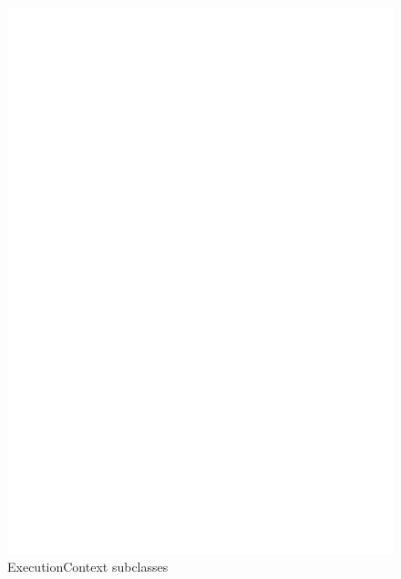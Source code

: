 \begin{figure}[tp]
\begin{center}
\includegraphics[scale=0.85]
{architettura_interna/dia/cntxclass}
\caption[ExecutionContext Class Diagram]{
   	\textsf{{\small ExecutionContext subclasses}} }
  \label{fig:cntxclass}
\end{center}
\end{figure}


